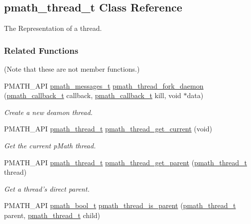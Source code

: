 \hypertarget{classpmath__thread__t}{
\subsection{pmath\_\-thread\_\-t Class Reference}
\label{classpmath__thread__t}
}
The Representation of a thread.  


\subsubsection*{Related Functions}
(Note that these are not member functions.) \begin{CompactItemize}
\item 
PMATH\_\-API \hyperlink{classpmath__messages__t}{pmath\_\-messages\_\-t} \hyperlink{classpmath__thread__t_e6fbf23fd1e7470c0bae379978902830}{pmath\_\-thread\_\-fork\_\-daemon} (\hyperlink{group__general__types_ge1a454657f18f3cc54508adeccccbcbc}{pmath\_\-callback\_\-t} callback, \hyperlink{group__general__types_ge1a454657f18f3cc54508adeccccbcbc}{pmath\_\-callback\_\-t} kill, void $\ast$data)
\begin{CompactList}\small\item\em Create a new deamon thread. \item\end{CompactList}\item 
PMATH\_\-API \hyperlink{classpmath__thread__t}{pmath\_\-thread\_\-t} \hyperlink{group__threads_g908b6ee94115539a20530cfb051dc52c}{pmath\_\-thread\_\-get\_\-current} (void)
\begin{CompactList}\small\item\em Get the current pMath thread. \item\end{CompactList}\item 
PMATH\_\-API \hyperlink{classpmath__thread__t}{pmath\_\-thread\_\-t} \hyperlink{group__threads_gb0e137fb921f9b329a8a9e7c4efa3b3d}{pmath\_\-thread\_\-get\_\-parent} (\hyperlink{classpmath__thread__t}{pmath\_\-thread\_\-t} thread)
\begin{CompactList}\small\item\em Get a thread's direct parent. \item\end{CompactList}\item 
PMATH\_\-API \hyperlink{group__general__types_gc92090cb0b56345d6c379ed2341d4ef4}{pmath\_\-bool\_\-t} \hyperlink{group__threads_g4409c7f042a1809eee72329002635fb9}{pmath\_\-thread\_\-is\_\-parent} (\hyperlink{classpmath__thread__t}{pmath\_\-thread\_\-t} parent, \hyperlink{classpmath__thread__t}{pmath\_\-thread\_\-t} child)

\end{CompactItemize}
